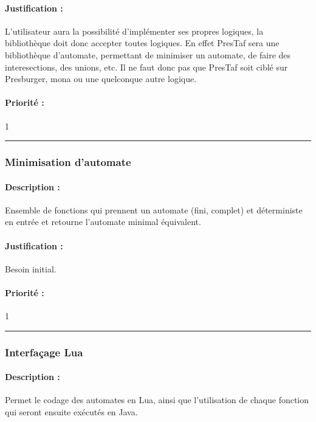 \documentclass{article}%
\begin{document}
\paragraph{Justification :} L'utilisateur aura la possibilité d'implémenter ses propres logiques, la bibliothèque doit donc accepter toutes logiques. En effet PresTaf sera une bibliothèque d'automate, permettant de minimiser un automate, de faire des interesections, des unions, etc. Il ne faut donc pas que PresTaf soit ciblé sur Presburger, mona ou une quelconque autre logique.

\paragraph{Priorité :} 1\\

\rule{\linewidth}{1pt}

\subsubsection{Minimisation d'automate}

\paragraph{Description :} Ensemble de fonctions qui prennent un automate (fini, complet) et déterministe en entrée et retourne l'automate minimal équivalent.

\paragraph{Justification :} Besoin initial.

\paragraph{Priorité :} 1\\

\rule{\linewidth}{1pt}

\subsubsection{Interfaçage Lua}

\paragraph{Description :} Permet le codage des automates en Lua, ainsi que l'utilisation de chaque fonction qui seront ensuite exécutés en Java.
\end{document}
